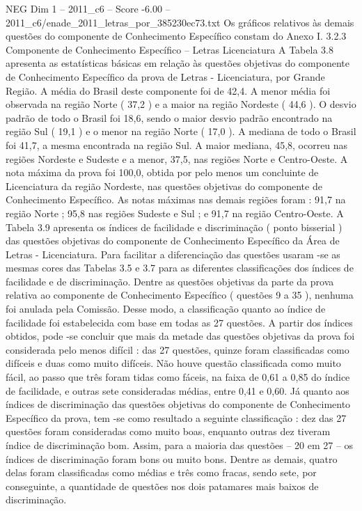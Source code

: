 \begin{textsample}{NEG Dim 1 – 2011\_c6 – Score -6.00 – 2011\_c6/enade\_2011\_letras\_por\_385230ec73.txt}
Os gráficos relativos às demais questões do componente de Conhecimento Específico constam do Anexo I. 3.2.3 Componente de Conhecimento Específico – Letras Licenciatura A Tabela 3.8 apresenta as estatísticas básicas em relação às questões objetivas do componente de Conhecimento Específico da prova de Letras - Licenciatura, por Grande Região.
A média do Brasil deste componente foi de 42,4.
A menor média foi observada na região Norte ( 37,2 ) e a maior na região Nordeste ( 44,6 ).
O desvio padrão de todo o Brasil foi 18,6, sendo o maior desvio padrão encontrado na região Sul ( 19,1 ) e o menor na região Norte ( 17,0 ).
A mediana de todo o Brasil foi 41,7, a mesma encontrada na região Sul.
A maior mediana, 45,8, ocorreu nas regiões Nordeste e Sudeste e a menor, 37,5, nas regiões Norte e Centro-Oeste.
A nota máxima da prova foi 100,0, obtida por pelo menos um concluinte de Licenciatura da região Nordeste, nas questões objetivas do componente de Conhecimento Específico.
As notas máximas nas demais regiões foram : 91,7 na região Norte ; 95,8 nas regiões Sudeste e Sul ; e 91,7 na região Centro-Oeste.
A Tabela 3.9 apresenta os índices de facilidade e discriminação ( ponto bisserial ) das questões objetivas do componente de Conhecimento Específico da Área de Letras - Licenciatura.
Para facilitar a diferenciação das questões usaram -se as mesmas cores das Tabelas 3.5 e 3.7 para as diferentes classificações dos índices de facilidade e de discriminação.
Dentre as questões objetivas da parte da prova relativa ao componente de Conhecimento Específico ( questões 9 a 35 ), nenhuma foi anulada pela Comissão.
Desse modo, a classificação quanto ao índice de facilidade foi estabelecida com base em todas as 27 questões.
A partir dos índices obtidos, pode -se concluir que mais da metade das questões objetivas da prova foi considerada pelo menos difícil : das 27 questões, quinze foram classificadas como difíceis e duas como muito difíceis.
Não houve questão classificada como muito fácil, ao passo que três foram tidas como fáceis, na faixa de 0,61 a 0,85 do índice de facilidade, e outras sete consideradas médias, entre 0,41 e 0,60.
Já quanto aos índices de discriminação das questões objetivas do componente de Conhecimento Específico da prova, tem -se como resultado a seguinte classificação : dez das 27 questões foram consideradas como muito boas, enquanto outras dez tiveram índice de discriminação bom.
Assim, para a maioria das questões – 20 em 27 – os índices de discriminação foram bons ou muito bons.
Dentre as demais, quatro delas foram classificadas como médias e três como fracas, sendo sete, por conseguinte, a quantidade de questões nos dois patamares mais baixos de discriminação.

\end{textsample}
